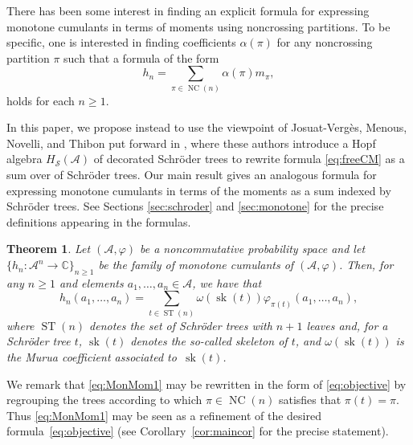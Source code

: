 \documentclass[pdftex]{sigma}%
\numberwithin{equation}{section}
\newtheorem{Theorem}{Theorem}[section]
\newcommand{\A}{\mathcal{A}}
\newcommand{\NC}{\operatorname{NC}}
\newcommand{\ST}{\operatorname{ST}}
\newcommand{\cHS}{H_\mathcal{S}}
\newcommand{\sk}{\operatorname{sk}}
\begin{document}
There has been some interest in finding an explicit formula for expressing monotone cumulants in terms of moments using noncrossing partitions. To be specific, one is interested in finding coefficients $\alpha(\pi)$ for any noncrossing partition $\pi$ such that a formula of the form
\begin{equation}\label{eq:objective}
h_n = \sum_{\pi\in \NC(n)} \alpha(\pi)m_\pi,
\end{equation}
holds for each $n\geq 1$.

In this paper, we propose instead to use the viewpoint of Josuat-Verg\`es, Menous, Novelli, and Thibon put forward in \cite{JMNT}, where these authors introduce a Hopf algebra $\cHS(\A)$ of decorated Schr\"oder trees to rewrite formula \eqref{eq:freeCM} as a sum over of Schr\"oder trees. Our main result gives an analogous formula for expressing monotone cumulants in terms of the moments as a sum indexed by Schr\"oder trees. See Sections \ref{sec:schroder} and \ref{sec:monotone} for the precise definitions appearing in the formulas.

\begin{Theorem}\label{thm:mainthm1}
Let $(\A,\varphi)$ be a noncommutative probability space and let $\{h_n\colon \A^n\to\mathbb{C}\}_{n\geq1}$ be the family of monotone cumulants of $(\A,\varphi)$. Then, for any $n\geq1$ and elements $a_1,\dots,a_n\in \A$, we have that
\begin{equation}\label{eq:MonMom1}
	h_n(a_1,\dots,a_n) =\sum_{t\in \ST(n)} \omega(\sk(t))\varphi_{\pi(t)} (a_1,\dots,a_n),
\end{equation}
where $\ST(n)$ denotes the set of Schr\"oder trees with $n+1$ leaves and, for a Schr\"oder tree $t$, $\sk(t)$ denotes the so-called skeleton of $t$, and $\omega(\sk(t))$ is the Murua coefficient associated to~$\sk(t)$.
\end{Theorem}

We remark that \eqref{eq:MonMom1} may be rewritten in the form of \eqref{eq:objective} by regrouping the trees according to which $\pi\in \NC(n)$ satisfies that $\pi(t)=\pi$. Thus \eqref{eq:MonMom1} may be seen as a refinement of the desired formula~\eqref{eq:objective} (see Corollary~\ref{cor:maincor} for the precise statement).
\end{document}
